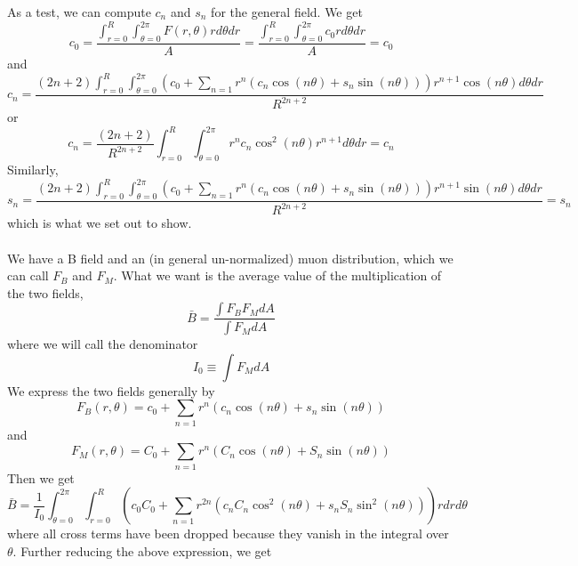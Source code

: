 \documentclass[twoside]{article}
\begin{document}
As a test, we can compute $c_n$ and $s_n$ for the general field. We get
\begin{equation}
c_0 = \frac{\int^{R}_{r = 0} \int^{2\pi}_{\theta = 0} F(r,\theta) r d\theta dr}{A} = 
\frac{\int^{R}_{r = 0} \int^{2\pi}_{\theta = 0} c_0 r d\theta dr}{A} = 
c_0
\end{equation}
and
\begin{equation}
c_n =
\frac{(2n + 2)\int^{R}_{r = 0}  \int^{2\pi}_{\theta = 0} 
(c_0 +  \sum_{n=1} r^{n} (c_{n} \cos(n \theta)  + s_{n} \sin(n \theta )   )) r^{n+1} \cos(n\theta) d\theta dr}{R^{2n+2}} 
\end{equation}
or
\begin{equation}
c_n =
\frac{(2n + 2)}{R^{2n+2}} 
\int^{R}_{r = 0}  \int^{2\pi}_{\theta = 0} 
r^{n} c_{n} \cos^2(n \theta)  r^{n+1} d\theta dr = c_n
\end{equation}
Similarly, 
\begin{equation}
s_n =
\frac{(2n + 2)\int^{R}_{r = 0}  \int^{2\pi}_{\theta = 0} 
	(c_0 +  \sum_{n=1} r^{n} (c_{n} \cos(n \theta)  + s_{n} \sin(n \theta )   )) r^{n+1} \sin(n\theta) d\theta dr}{R^{2n+2}}  = s_n
\end{equation}
which is what we set out to show. \\
\\
We have a B field and an (in general  un-normalized) muon distribution, which we can call $F_B$ and $F_M$. What we want is the average value of the multiplication of the two fields, 
\begin{equation}
\bar{B} = \frac{\int F_B F_M dA}{\int F_M dA}
\end{equation}
where we will call the denominator
\begin{equation}
\boxed{
I_0 \equiv \int F_M dA
}
\end{equation}
We express the two fields generally by
\begin{equation}
F_B(r,\theta) =   c_0 +  \sum_{n=1} r^{n} (c_{n} \cos(n \theta)  + s_{n} \sin(n \theta )   )
\end{equation}
and
\begin{equation}
F_M(r,\theta) =   C_0 +  \sum_{n=1} r^{n} (C_{n} \cos(n \theta)  + S_{n} \sin(n \theta )   )
\end{equation}
Then we get 
\begin{equation}
\bar{B} = \frac{1}{I_0}\int^{2\pi}_{\theta=0} \int^R_{r=0} (c_0C_0 + \sum_{n=1}r^{2n}(c_nC_n\cos^2(n \theta) + s_nS_n\sin^2(n \theta) )   )  r dr d\theta
\end{equation}
where all cross terms have been dropped because they vanish in the integral over $\theta$. Further reducing the above expression, we get 
\end{document}
